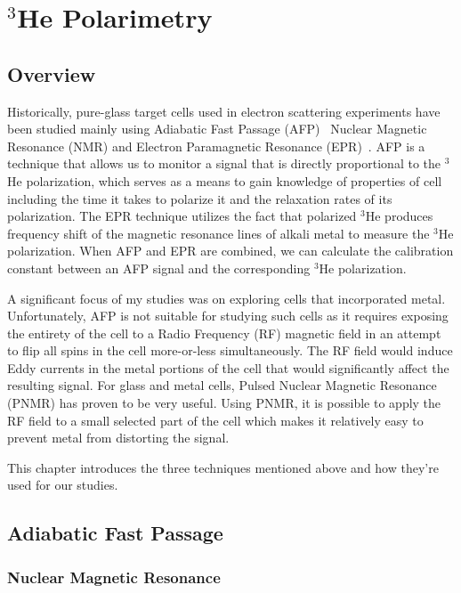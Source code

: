 \chapter{$^{3}$He Polarimetry}
\label{chap:chap3}

\section{Overview}

Historically, pure-glass target cells used in electron scattering experiments have been studied mainly using Adiabatic Fast Passage (AFP)~\cite{Abragam} Nuclear Magnetic Resonance (NMR) and Electron Paramagnetic Resonance (EPR)~\cite{PhysRevA.58.3004}. AFP is a technique that allows us to monitor a signal that is directly proportional to the $^{3}$He polarization, which serves as a means to gain knowledge of properties of cell including the time it takes to polarize it and the relaxation rates of its polarization. The EPR technique utilizes the fact that polarized $^{3}$He produces frequency shift of the magnetic resonance lines of alkali metal to measure the $^{3}$He polarization. When AFP and EPR are combined, we can calculate the calibration constant between an AFP signal and the corresponding $^{3}$He polarization. 

A significant focus of my studies was on exploring cells that incorporated metal. Unfortunately, AFP is not suitable for studying such cells as it requires exposing the entirety of the cell to a Radio Frequency (RF) magnetic field in an attempt to flip all spins in the cell more-or-less simultaneously. The RF field would induce Eddy currents in the metal portions of the cell that would significantly affect the resulting signal. For glass and metal cells, Pulsed Nuclear Magnetic Resonance (PNMR) has proven to be very useful. Using PNMR, it is possible to apply the RF field to a small selected part of the cell which makes it relatively easy to prevent metal from distorting the signal. 

This chapter introduces the three techniques mentioned above and how they're used for our studies.

\section{Adiabatic Fast Passage}

\subsection{Nuclear Magnetic Resonance}

